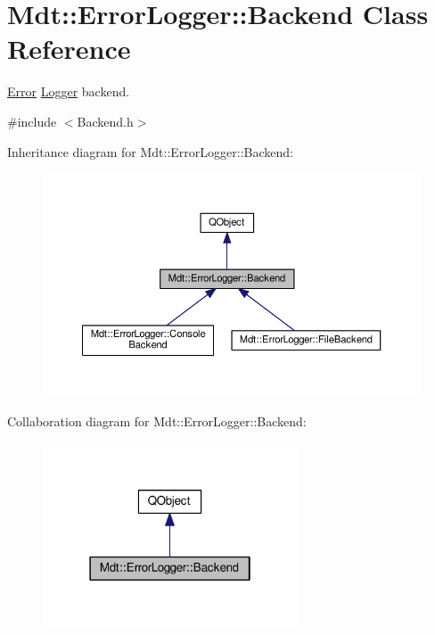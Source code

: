\hypertarget{class_mdt_1_1_error_logger_1_1_backend}{}\section{Mdt\+:\+:Error\+Logger\+:\+:Backend Class Reference}
\label{class_mdt_1_1_error_logger_1_1_backend}


\hyperlink{class_mdt_1_1_error}{Error} \hyperlink{class_mdt_1_1_error_logger_1_1_logger}{Logger} backend.  




{\ttfamily \#include $<$Backend.\+h$>$}



Inheritance diagram for Mdt\+:\+:Error\+Logger\+:\+:Backend\+:
\nopagebreak
\begin{figure}[H]
\begin{center}
\leavevmode
\includegraphics[width=350pt]{class_mdt_1_1_error_logger_1_1_backend__inherit__graph}
\end{center}
\end{figure}


Collaboration diagram for Mdt\+:\+:Error\+Logger\+:\+:Backend\+:
\nopagebreak
\begin{figure}[H]
\begin{center}
\leavevmode
\includegraphics[width=214pt]{class_mdt_1_1_error_logger_1_1_backend__coll__graph}
\end{center}
\end{figure}
